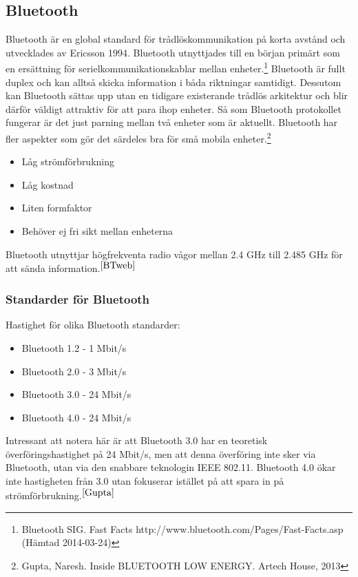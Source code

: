 \documentclass[a4paper,12pt,fleqn]{article}
\begin{document}
\subsection{Bluetooth}

Bluetooth är en global standard för trådlöskommunikation på korta avstånd och utvecklades av Ericsson 1994. Bluetooth utnyttjades till en början primärt som en ersättning för serielkommunikationskablar mellan enheter.\footnote{\label{BTweb}Bluetooth SIG. Fast Facts http://www.bluetooth.com/Pages/Fast-Facts.asp (Hämtad 2014-03-24)}
Bluetooth är fullt duplex och kan alltså skicka information i båda riktningar samtidigt. Dessutom kan Bluetooth sättas upp utan en tidigare existerande trådlös arkitektur och blir därför väldigt attraktiv för att para ihop enheter. Så som Bluetooth protokollet fungerar är det just parning mellan två enheter som är aktuellt. Bluetooth har fler aspekter som gör det särdeles bra för små mobila enheter.\footnote{\label{Gupta}Gupta, Naresh. Inside BLUETOOTH LOW ENERGY. Artech House, 2013}
\begin{itemize}
\item Låg strömförbrukning 
\item Låg kostnad
\item Liten formfaktor
\item Behöver ej fri sikt mellan enheterna
\end{itemize}

Bluetooth utnyttjar högfrekventa radio vågor mellan 2.4 GHz till 2.485 GHz för att sända information.$^{\ref{BTweb}}$

\subsubsection{Standarder för Bluetooth}
Hastighet för olika Bluetooth standarder:
\begin{itemize}
\item Bluetooth 1.2 - 1 Mbit/s 
\item Bluetooth 2.0 - 3 Mbit/s
\item Bluetooth 3.0 - 24 Mbit/s
\item Bluetooth 4.0 - 24 Mbit/s
\end{itemize}

Intressant att notera här är att Bluetooth 3.0 har en teoretisk överföringshastighet på 24 Mbit/s, men att denna överföring inte sker via Bluetooth, utan via den snabbare teknologin IEEE 802.11. 
Bluetooth 4.0 ökar inte hastigheten från 3.0 utan fokuserar istället på att spara in på strömförbrukning.$^{\ref{Gupta}}$
\end{document}
